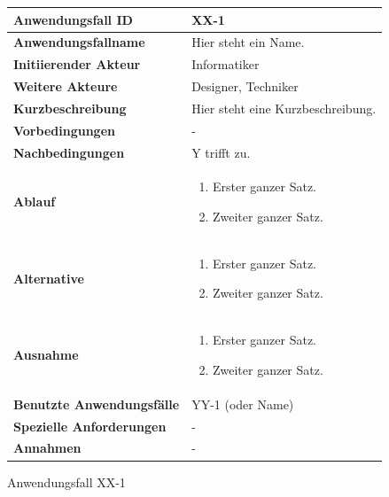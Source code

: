 \begin{figure}[h]
	\centering
	\begin{tabularx}{\textwidth}{ X | X }
		\textbf{Anwendungsfall ID} & XX-1 \\ \hline
		\textbf{Anwendungsfallname} & Hier steht ein Name. \\ \hline
		\textbf{Initiierender Akteur} & Informatiker \\ \hline
		\textbf{Weitere Akteure} & Designer, Techniker  \\ \hline
		\textbf{Kurzbeschreibung} & Hier steht eine Kurzbeschreibung.  \\ \hline
		\textbf{Vorbedingungen} & -  \\ \hline
		\textbf{Nachbedingungen} & Y trifft zu.  \\ \hline
		\textbf{Ablauf} &
		\begin{enumerate}
			\item Erster ganzer Satz.
			\item Zweiter ganzer Satz.
		\end{enumerate} \\ \hline
		\textbf{Alternative} &
		\begin{enumerate}
			\item Erster ganzer Satz.
			\item Zweiter ganzer Satz.
		\end{enumerate}  \\ \hline
		\textbf{Ausnahme} &
		\begin{enumerate}
			\item Erster ganzer Satz.
			\item Zweiter ganzer Satz.
		\end{enumerate}  \\ \hline
		\textbf{Benutzte Anwendungsfälle} & YY-1 (oder Name) \\ \hline
		\textbf{Spezielle Anforderungen} & - \\ \hline
		\textbf{Annahmen} & -
	\end{tabularx}
	\caption{Anwendungsfall XX-1}
	\label{fig:anwendungsfall-server-tabelle-xx-1}
\end{figure}